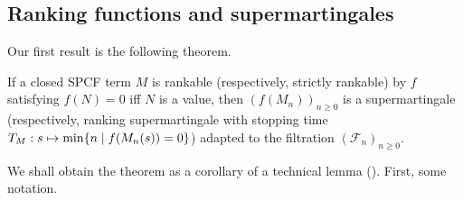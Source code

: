 \subsection{Ranking functions and supermartingales}


Our first result is the following theorem.
\begin{theorem}[Rankability] 
\label{thm:rankable and strict rankable}
If a closed SPCF term $M$ is rankable (respectively, strictly rankable) by $f$ satisfying $f(N) = 0$ iff $N$ is a value, then $(f(M_n))_{n \geq 0}$ is a supermartingale (respectively, ranking supermartingale with stopping time $T_M: s \mapsto \min \{n \mid f(M_n(s)) = 0\}$) adapted to the filtration $(\mathcal{F}_n)_{n \geq 0}$. %
\end{theorem}


We shall obtain the theorem as a corollary of a technical lemma ().
First, some notation.

